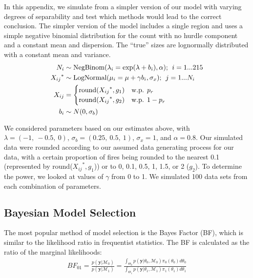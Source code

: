 \documentclass[10pt,letterpaper]{article}
\begin{document}
In this appendix, we simulate from a simpler version of our model with
varying degrees of separability and test which methods would lead to the
correct conclusion. The simpler version of the model includes a single
region and uses a simple negative binomial distribution for the count
with no hurdle component and a constant mean and dispersion. The
``true'' sizes are lognormally distributed with a constant mean and
variance. \begin{align*}
N_i &\sim \text{NegBinom}(\lambda_i = \exp(\lambda + b_i), \alpha)\text{;\; }i=1...215\\
{X_{ij}}^* &\sim \text{LogNormal}(\mu_i = \mu + \gamma b_i, \sigma_x)\text{;\; }j = 1...N_i\\
X_{ij} &= \begin{cases}
\text{round}({X_{ij}}^*, g_1) & \text{w.p. }p_r\\
\text{round}({X_{ij}}^*, g_2) & \text{w.p. }1-p_r
\end{cases}\\
b_i &\sim N(0, \sigma_b)
\end{align*}

We considered parameters based on our estimates above, with
\(\lambda = (-1,~-0.5,~0)\), \(\sigma_b = (0.25,~0.5,~1)\),
\(\sigma_x = 1\), and \(\alpha = 0.8\). Our simulated data were rounded
according to our assumed data generating process for our data, with a certain proportion of fires being
rounded to the nearest 0.1 (represented by round(\({X_{ij}}^*, g_1\))) or
to 0, 0.1, 0.5, 1, 1.5, or 2 (\(g_2\)). To determine the power, we
looked at values of \(\gamma\) from 0 to 1. We simulated 100 data sets
from each combination of parameters.

\hypertarget{bayesian-model-selection}{%
\subsection{Bayesian Model Selection}\label{bayesian-model-selection}}

The most popular method of model selection is the Bayes Factor (BF),
which is similar to the likelihood ratio in frequentist statistics. The
BF is calculated as the ratio of the marginal likelihoods: \begin{align}
BF_{01} = \frac{p(\mathbf y | \mathcal{M}_0)}{p(\mathbf y | \mathcal{M}_1)} =
\frac{\int_{\Theta_0} p(\mathbf y | \theta_0, \mathcal{M} _0)\pi_0(\theta_0)d\theta_0}{\int_{\Theta_1} p(\mathbf y | \theta_1, \mathcal{M} _1)\pi_1(\theta_1)d\theta_1}
\label{BF}
\end{align}
\end{document}
